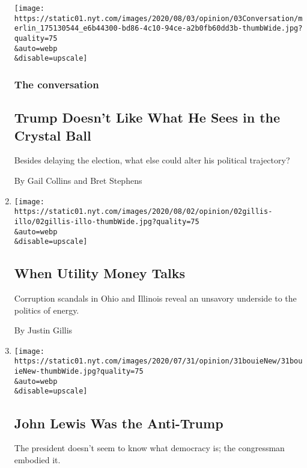 \begin{enumerate}
  \texttt{[image: https://static01.nyt.com/images/2020/08/03/opinion/03Conversation/merlin\_175130544\_e6b44300-bd86-4c10-94ce-a2b0fb60dd3b-thumbWide.jpg?quality=75\\\&auto=webp\\\&disable=upscale]}

  \hypertarget{the-conversation}{%
  \subsubsection{The conversation}\label{the-conversation}}

  \hypertarget{trump-doesnt-like-what-he-sees-in-the-crystal-ball}{%
  \subsection{Trump Doesn't Like What He Sees in the Crystal
  Ball}\label{trump-doesnt-like-what-he-sees-in-the-crystal-ball}}

  Besides delaying the election, what else could alter his political
  trajectory?

  By Gail Collins and Bret Stephens
\item
  \href{/2020/08/02/opinion/utility-corruption-energy.html}{}

  \texttt{[image: https://static01.nyt.com/images/2020/08/02/opinion/02gillis-illo/02gillis-illo-thumbWide.jpg?quality=75\\\&auto=webp\\\&disable=upscale]}

  \hypertarget{when-utility-money-talks}{%
  \subsection{When Utility Money Talks}\label{when-utility-money-talks}}

  Corruption scandals in Ohio and Illinois reveal an unsavory underside
  to the politics of energy.

  By Justin Gillis
\item
  \href{/2020/07/31/opinion/sunday/john-lewis-trump-election-2020.html}{}

  \texttt{[image: https://static01.nyt.com/images/2020/07/31/opinion/31bouieNew/31bouieNew-thumbWide.jpg?quality=75\\\&auto=webp\\\&disable=upscale]}

  \hypertarget{john-lewis-was-the-anti-trump}{%
  \subsection{John Lewis Was the
  Anti-Trump}\label{john-lewis-was-the-anti-trump}}

  The president doesn't seem to know what democracy is; the congressman
  embodied it.


\end{enumerate}

